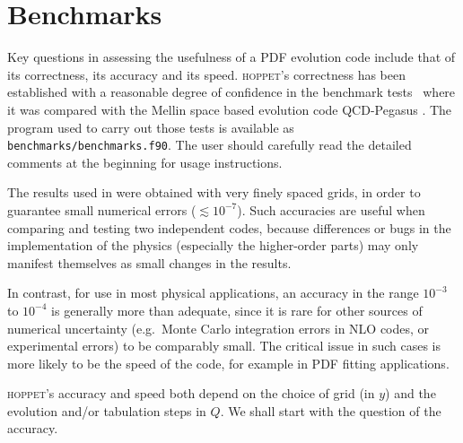 \documentclass[12pt]{article}
\newcommand{\eg}{e.g.\ }
\newcommand{\hoppet}{\textsc{hoppet}\xspace}
\newcommand{\ttt}[1]{\texttt{#1}}
\begin{document}
\section{Benchmarks}
\label{sec:benchmarks}

Key questions in assessing the usefulness of a PDF evolution code include
that of its correctness, its accuracy and its speed. \hoppet's
correctness has been established with a reasonable degree of
confidence in the benchmark tests~\cite{Benchmarks} where it was
compared with the Mellin space based
evolution code QCD-Pegasus \cite{Pegasus}. 
The program used to carry out those tests
is available as \ttt{benchmarks/benchmarks.f90}. The user should
carefully read the detailed
comments at the beginning for usage instructions.

The results used in \cite{Benchmarks} were obtained with very finely
spaced grids, in order to guarantee small numerical errors ($\lesssim
10^{-7}$).  Such accuracies are useful when comparing and testing two
independent codes, because differences or bugs in the
implementation of the physics (especially the higher-order parts) may
only manifest themselves as small changes in the results.

In contrast, for use in most physical applications, an accuracy in the
range $10^{-3}$ to $10^{-4}$ is generally more than adequate, since it
is rare for other sources of numerical uncertainty (\eg Monte Carlo
integration errors in NLO codes, or experimental errors) to be
comparably small. The critical issue in such cases is more likely to
be the speed of the code, for example in PDF fitting
applications.

\hoppet's accuracy and speed both depend on the choice of grid (in
$y$) and the evolution and/or tabulation steps in $Q$. We shall start
with the question of the accuracy.


\end{document}
